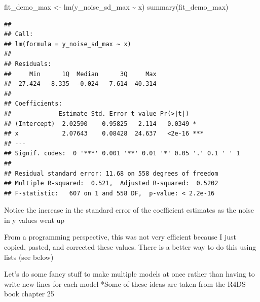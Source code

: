 \documentclass[
]{book}
\newenvironment{Shaded}{\begin{snugshade}}{\end{snugshade}}
\newcommand{\AttributeTok}[1]{\textcolor[rgb]{0.77,0.63,0.00}{#1}}
\newcommand{\ControlFlowTok}[1]{\textcolor[rgb]{0.13,0.29,0.53}{\textbf{#1}}}
\newcommand{\DecValTok}[1]{\textcolor[rgb]{0.00,0.00,0.81}{#1}}
\newcommand{\FunctionTok}[1]{\textcolor[rgb]{0.00,0.00,0.00}{#1}}
\newcommand{\NormalTok}[1]{#1}
\newcommand{\OtherTok}[1]{\textcolor[rgb]{0.56,0.35,0.01}{#1}}
\newcommand{\SpecialCharTok}[1]{\textcolor[rgb]{0.00,0.00,0.00}{#1}}
\begin{document}
\begin{Shaded}
\begin{Highlighting}[]
\NormalTok{fit\_demo\_max }\OtherTok{\textless{}{-}} \FunctionTok{lm}\NormalTok{(y\_noise\_sd\_max }\SpecialCharTok{\textasciitilde{}}\NormalTok{ x)}
\FunctionTok{summary}\NormalTok{(fit\_demo\_max)}
\end{Highlighting}
\end{Shaded}

\begin{verbatim}
## 
## Call:
## lm(formula = y_noise_sd_max ~ x)
## 
## Residuals:
##     Min      1Q  Median      3Q     Max 
## -27.424  -8.335  -0.024   7.614  40.314 
## 
## Coefficients:
##             Estimate Std. Error t value Pr(>|t|)    
## (Intercept)  2.02590    0.95825   2.114   0.0349 *  
## x            2.07643    0.08428  24.637   <2e-16 ***
## ---
## Signif. codes:  0 '***' 0.001 '**' 0.01 '*' 0.05 '.' 0.1 ' ' 1
## 
## Residual standard error: 11.68 on 558 degrees of freedom
## Multiple R-squared:  0.521,  Adjusted R-squared:  0.5202 
## F-statistic:   607 on 1 and 558 DF,  p-value: < 2.2e-16
\end{verbatim}

Notice the increase in the standard error of the coefficient estimates as the noise in y values went up

From a programming perspective, this was not very efficient because I just copied, pasted, and corrected these values.
There is a better way to do this using lists (see below)

Let's do some fancy stuff to make multiple models at once rather than having to write new lines for each model
*Some of these ideas are taken from the R4DS book chapter 25

\begin{Shaded}
\end{Shaded}
\end{document}
